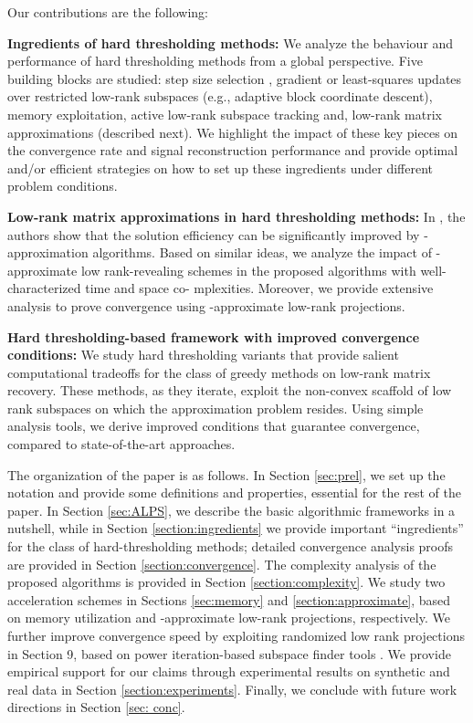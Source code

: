 \documentclass[twocolumn]{svjour3}
\begin{document}
Our contributions are the following:

\textbf{Ingredients of hard thresholding methods:} We analyze the behaviour and performance of hard thresholding methods from a global perspective. Five building blocks are studied:  step size selection ,  gradient or least-squares updates over restricted low-rank subspaces (e.g., adaptive block coordinate descent),  memory exploitation,  active low-rank subspace tracking and,  low-rank matrix approximations (described next). We highlight the impact of these key pieces on the convergence rate and signal reconstruction performance and provide optimal and/or efficient strategies on how to set up these ingredients under different problem conditions. 

\textbf{Low-rank matrix approximations in hard thresholding methods:} 
In \cite{clash}, the authors show that the solution efficiency can be significantly improved by -approximation algorithms. Based on similar ideas, we analyze the impact of -approximate low rank-revealing schemes in the proposed algorithms with well-characterized time and space co- mplexities. Moreover, we provide extensive analysis to prove convergence using -approximate low-rank projections.

\textbf{Hard thresholding-based framework with improved convergence conditions:} We study hard thresholding variants that provide salient computational tradeoffs for the class of greedy methods on low-rank matrix recovery. These methods, as they iterate, exploit the non-convex scaffold of low rank subspaces on which the approximation problem resides. Using simple analysis tools, we derive improved conditions that guarantee convergence, compared to state-of-the-art approaches. 

The organization of the paper is as follows. In Section \ref{sec:prel}, we set up the notation and provide some definitions and properties, essential for the rest of the paper. In Section \ref{sec:ALPS}, we describe the basic algorithmic frameworks in a nutshell, while in Section {\ref{section:ingredients}} we provide important ``ingredients'' for the class of hard-thresholding methods; detailed convergence analysis proofs are provided in Section \ref{section:convergence}. The complexity analysis of the proposed algorithms is provided in Section \ref{section:complexity}. We study two acceleration schemes in Sections \ref{sec:memory} and \ref{section:approximate}, based on memory utilization and -approximate low-rank projections, respectively. We further improve convergence speed by exploiting randomized low rank projections in Section 9, based on power iteration-based subspace finder tools \cite{findingstructure}. We provide empirical support for our claims through experimental results on synthetic and real data in Section \ref{section:experiments}. Finally, we conclude with future work directions in Section \ref{sec: conc}.
\end{document}
